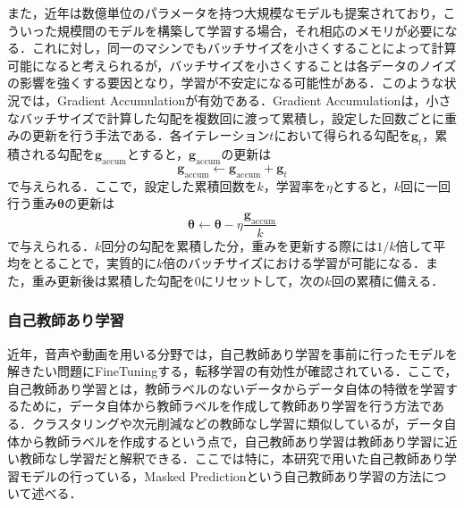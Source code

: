 \documentclass[12pt]{jarticle}
\numberwithin{equation}{section}    %
\numberwithin{figure}{section}      %
\numberwithin{table}{section}      %
\begin{document}
また，近年は数億単位のパラメータを持つ大規模なモデルも提案されており，こういった規模間のモデルを構築して学習する場合，それ相応のメモリが必要になる．これに対し，同一のマシンでもバッチサイズを小さくすることによって計算可能になると考えられるが，バッチサイズを小さくすることは各データのノイズの影響を強くする要因となり，学習が不安定になる可能性がある．このような状況では，Gradient Accumulationが有効である．Gradient Accumulationは，小さなバッチサイズで計算した勾配を複数回に渡って累積し，設定した回数ごとに重みの更新を行う手法である．各イテレーション$t$において得られる勾配を$\bm{g}_{t}$，累積される勾配を$\bm{g}_{\text{accum}}$とすると，$\bm{g}_{\text{accum}}$の更新は
\begin{equation}
    \bm{g}_{\text{accum}} \gets \bm{g}_{\text{accum}} + \bm{g}_{t}
\end{equation}
で与えられる．ここで，設定した累積回数を$k$，学習率を$\eta$とすると，$k$回に一回行う重み$\bm{\theta}$の更新は
\begin{equation}
    \bm{\theta} \gets \bm{\theta} - \eta \frac{\bm{g}_{\text{accum}}}{k}
\end{equation}
で与えられる．$k$回分の勾配を累積した分，重みを更新する際には$1 / k$倍して平均をとることで，実質的に$k$倍のバッチサイズにおける学習が可能になる．また，重み更新後は累積した勾配を0にリセットして，次の$k$回の累積に備える．

\subsubsection{自己教師あり学習}
近年，音声や動画を用いる分野では，自己教師あり学習を事前に行ったモデルを解きたい問題にFineTuningする，転移学習の有効性が確認されている．ここで，自己教師あり学習とは，教師ラベルのないデータからデータ自体の特徴を学習するために，データ自体から教師ラベルを作成して教師あり学習を行う方法である．クラスタリングや次元削減などの教師なし学習に類似しているが，データ自体から教師ラベルを作成するという点で，自己教師あり学習は教師あり学習に近い教師なし学習だと解釈できる．ここでは特に，本研究で用いた自己教師あり学習モデルの行っている，Masked Predictionという自己教師あり学習の方法について述べる．
\end{document}
